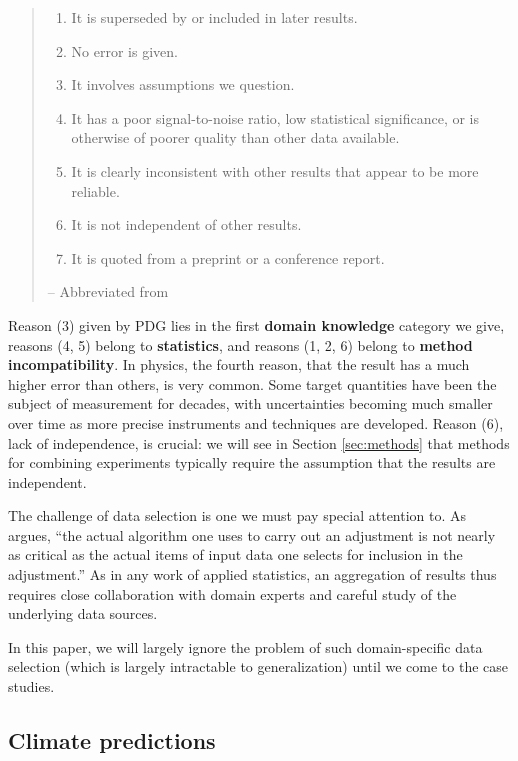 \documentclass[letterpaper,12pt]{article}
\begin{document}
\begin{quote}
  \begin{enumerate}
  \item It is superseded by or included in later results.
  \item No error is given.
  \item It involves assumptions we question.
  \item It has a poor signal-to-noise ratio, low statistical significance, or is otherwise of poorer quality than other data available.
  \item It is clearly inconsistent with other results that appear to be more reliable.
  \item It is not independent of other results.
  \item It is quoted from a preprint or a conference report.
  \end{enumerate} \hfill -- Abbreviated from \citet[Section 5.1]{navas2024review}
\end{quote}

Reason (3) given by PDG lies in the first \textbf{domain knowledge} category we give, reasons (4, 5) belong to \textbf{statistics}, and reasons (1, 2, 6) belong to \textbf{method incompatibility}. In physics, the fourth reason, that the result has a much higher error than others, is very common. Some target quantities have been the subject of measurement for decades, with uncertainties becoming much smaller over time as more precise instruments and techniques are developed. Reason (6), lack of independence, is crucial: we will see in Section \ref{sec:methods} that methods for combining experiments typically require the assumption that the results are independent.

The challenge of data selection is one we must pay special attention to. As \citet{taylor1982numerical} argues, ``the actual algorithm one uses to carry out an adjustment is not nearly as critical as the actual items of input data one selects for inclusion in the adjustment.'' As in any work of applied statistics, an aggregation of results thus requires close collaboration with domain experts and careful study of the underlying data sources.

In this paper, we will largely ignore the problem of such domain-specific data selection (which is largely intractable to generalization) until we come to the case studies.

\subsection{Climate predictions}
\end{document}

